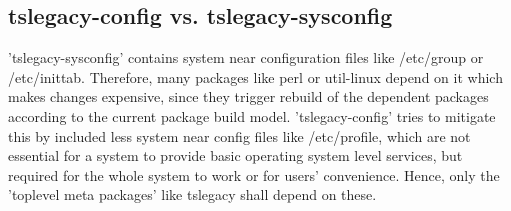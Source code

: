 \documentclass[a4paper]{article}
\begin{document}
	\subsection{tslegacy-config vs. tslegacy-sysconfig}
	'tslegacy-sysconfig' contains system near configuration files like /etc/group or /etc/inittab. Therefore, many packages like perl or util-linux depend on it which makes changes expensive, since they trigger rebuild of the dependent packages according to the current package build model. 'tslegacy-config' tries to mitigate this by included less system near config files like /etc/profile, which are not essential for a system to provide basic operating system level services, but required for the whole system to work or for users' convenience. Hence, only the 'toplevel meta packages' like tslegacy shall depend on these.
\end{document}
